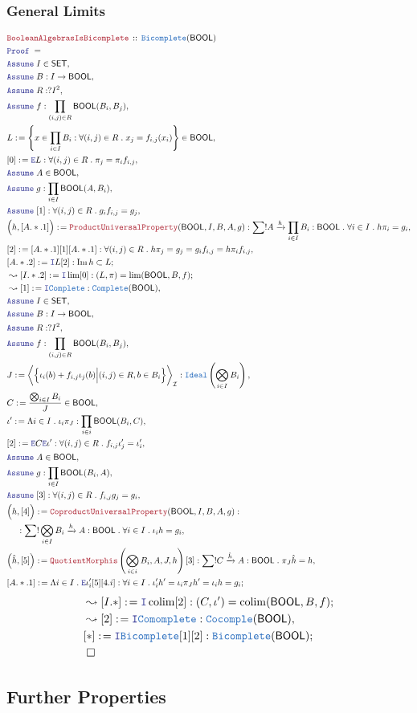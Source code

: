 \documentclass[12pt]{scrartcl}
\newcommand{\TYPE}[1]{\textcolor{NavyBlue}{\mathtt{#1}}}
\newcommand{\LOGIC}[1]{\textcolor{Blue}{\mathtt{#1}}}
\newcommand{\THM}[1]{\textcolor{Maroon}{\mathtt{#1}}}
\renewcommand{\.}{\; . \;}
\newcommand{\de}{: \kern 0.1pc =}
\newcommand{\Act}[1]{\left( #1 \right)}
\newcommand{\Theorem}[2]{& \THM{#1} \, :: \, #2 \\ & \Proof = \\ }
\newcommand{\NewLine}{\\ & \kern 1pc}
\newcommand{\Page}[1]{ \begin{align*} #1 \end{align*}   }
\newcommand{\Intro}{\LOGIC{I}}
\newcommand{\Elim}{\LOGIC{E}}
\DeclareMathOperator*{\im}{Im}
\newcommand{\Arrow}{\xrightarrow}
\newcommand{\Say}[3]{& #1 \de #2 : #3, \\}
\newcommand{\SayIn}[3]{& #1 \de #2 \in #3, \\}
\newcommand{\Conclude}[3]{& #1 \de #2 : #3; \\}
\newcommand{\Derive}[3]{& \leadsto #1 \de #2 : #3, \\}
\newcommand{\DeriveConclude}[3]{& \leadsto #1 \de #2 : #3 ; \\}
\newcommand{\Assume}[2]{& \LOGIC{Assume} \; #1 : #2, \\}
\newcommand{\AssumeIn}[2]{& \LOGIC{Assume} \; #1 \in #2, \\}
\newcommand{\QED}{\; \square}
\newcommand{\EndProof}{& \QED \\}
\newcommand{\Proof}{\LOGIC{Proof} \; }
\newcommand{\Ideal}{\TYPE{Ideal}}
\DeclareMathOperator*{\colim}{colim}
\newcommand{\I}{\mathcal{I}}
\newcommand{\SET}{\mathsf{SET}}
\newcommand{\Complete}{\TYPE{Complete}}
\newcommand{\BOOL}{\mathsf{BOOL}}
\begin{document}
\subsubsection{General Limits}
\Page{
	\Theorem{BooleanAlgebrasIsBicomplete}
	{
		\TYPE{Bicomplete}(\BOOL)
	}
	\AssumeIn{I}{\SET}
	\Assume{B}{I \to \BOOL}
	\Assume{R}{?I^2}
	\Assume{f}{\prod_{(i,j)\in R} \BOOL(B_i,B_j)}
	\SayIn{L}{
		\left\{
			x \in \prod_{i \in I} B_i :
			\forall (i,j) \in R \.
			x_j = f_{i,j}(x_i) 
		\right\}
	}{\BOOL}
	\Say{[0]}
	{
		\Elim L
	}
	{
		\forall (i,j) \in R \.
		\pi_j = \pi_i f_{i,j}
	}
	\AssumeIn{A}{\BOOL}
	\Assume{g}{\prod_{i \in I} \BOOL(A,B_i)}
	\Assume{[1]}{\forall (i,j) \in R \. g_i f_{i,j} = g_j}
	\Say{\Big(h,[A.*.1]\Big)}{\THM{ProductUniversalProperty}(\BOOL,I,B,A,g)}
	{
		\sum! A \Arrow{h} \prod_{i \in I} B_i : \BOOL \.
		\forall i \in I \. h\pi_i = g_i
	}
	\Say{[2]}{[A.*.1][1][A.*.1]}
	{
		\forall (i,j) \in R \.
		h \pi_j =  g_j = g_i f_{i,j} = h \pi_i f_{i,j}
	}
	\Conclude{[A.*.2]}{\Intro L [2]}{ \im h \subset L }
	\DeriveConclude{[I.*.2]}{\Intro \lim [0]}
	{ (L,\pi) = \lim (\BOOL,B,f )}	
	\Derive{[1]}{\Intro \Complete}{\Complete(\BOOL)}
	\AssumeIn{I}{\SET}
	\Assume{B}{I \to \BOOL}
	\Assume{R}{?I^2}
	\Assume{f}{\prod_{(i,j)\in R} \BOOL(B_i,B_j)}
	\Say{J}{ 
		\bigg\langle 
			\Big\{ 
				\iota_i(b) + f_{i,j}\iota_j(b)
				\Big|
				(i,j) \in R , b \in B_i   
			\Big\} 
		\bigg\rangle_\I 
	}
	{
		\Ideal\Act{\bigotimes_{i \in I} B_i}
	}
	\SayIn{C}{\frac{\bigotimes_{i \in I} B_i}{J}}{\BOOL}
	\Say{\iota'}{\Lambda i \in I \. \iota_i \pi_J}{ \prod_{i \in i} \BOOL(B_i,C)  }
	\Say{[2]}{\Elim C \Elim \iota'}{\forall (i,j) \in R \. f_{i,j}\iota_j' = \iota_i'}
	\AssumeIn{A}{\BOOL}
	\Assume{g}{\prod_{i \in I} \BOOL(B_i,A)}
	\Assume{[3]}{\forall (i,j) \in R \.  f_{i,j} g_j = g_i}
	\Say{\Big(h,[4]\Big)}{\THM{CoproductUniversalProperty}(\BOOL,I,B,A,g)}
	{
		\NewLine :		
		\sum! \bigotimes_{i \in I} B_i \Arrow{h} A : \BOOL \.
		\forall i \in I \. \iota_i h = g_i
	}
	\Say{\Big(\hat h,[5]\Big)}{
		\THM{QuotientMorphis}\Act{
			\bigotimes_{i \in i} B_i,A,J,h}[3]
		}
		{
			\sum!  C \Arrow{\hat h} A : \BOOL \.
			\pi_J \hat h = h
		}
	\Conclude{[A.*.1]}
	{
		\Lambda i \in I \.
		\Elim \iota'_i 
		[5]
		[4.i]
	}
	{
		\forall i \in I \. 
		\iota'_i h' = 
		\iota_i \pi_J h' =
		\iota_i h =
		g_i
	}
}
\Page{
	\DeriveConclude{[I.*]}{\Intro \colim [2]}
	{
		(C,\iota') = \colim (\BOOL,B,f)
	}
	\Derive{[2]}{\Intro \TYPE{Comomplete}}
	{
		\TYPE{Cocomple}(\BOOL)
	}
	\Conclude{[*]}{\Intro \TYPE{Bicomplete}[1][2]}
	{
		\TYPE{Bicomplete}(\BOOL)
	}
	\EndProof
}
\newpage
\subsection{Further Properties}
\end{document}
